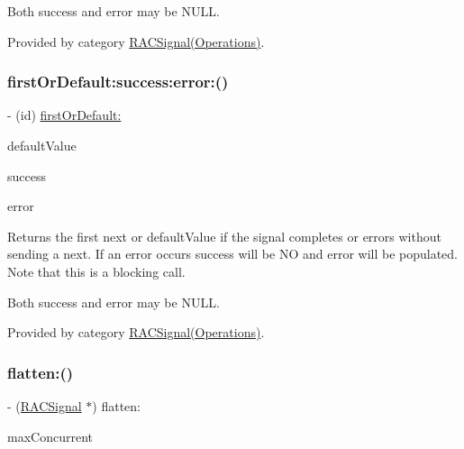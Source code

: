 Both success and error may be N\+U\+LL. 

Provided by category \mbox{\hyperlink{category_r_a_c_signal_07_operations_08_a12b765a16842e9c7aa1d13b00d8df09b}{R\+A\+C\+Signal(\+Operations)}}.

\mbox{\label{interface_r_a_c_signal_a12b765a16842e9c7aa1d13b00d8df09b}} 
\subsubsection{\texorpdfstring{first\+Or\+Default\+:success\+:error\+:()}{firstOrDefault:success:error:()}\hspace{0.1cm}{\footnotesize\ttfamily [3/3]}}
{\footnotesize\ttfamily -\/ (id) \mbox{\hyperlink{category_r_a_c_signal_07_operations_08_a51f980781f2dc9e662278d7db7b0cd38}{first\+Or\+Default\+:}} \begin{DoxyParamCaption}\item[{(id)}]{default\+Value }\item[{success:(B\+O\+OL $\ast$)}]{success }\item[{error:(N\+S\+Error $\ast$$\ast$)}]{error }\end{DoxyParamCaption}}

Returns the first {\ttfamily next} or {\ttfamily default\+Value} if the signal completes or errors without sending a {\ttfamily next}. If an error occurs success will be NO and error will be populated. Note that this is a blocking call.

Both success and error may be N\+U\+LL. 

Provided by category \mbox{\hyperlink{category_r_a_c_signal_07_operations_08_a12b765a16842e9c7aa1d13b00d8df09b}{R\+A\+C\+Signal(\+Operations)}}.

\mbox{\label{interface_r_a_c_signal_a72e5f2fd80960ee5422e08ceef0f4e2c}} 
\subsubsection{\texorpdfstring{flatten\+:()}{flatten:()}\hspace{0.1cm}{\footnotesize\ttfamily [1/3]}}
{\footnotesize\ttfamily -\/ (\mbox{\hyperlink{interface_r_a_c_signal}{R\+A\+C\+Signal}} $\ast$) flatten\+: \begin{DoxyParamCaption}\item[{(N\+S\+U\+Integer)}]{max\+Concurrent }\end{DoxyParamCaption}}

